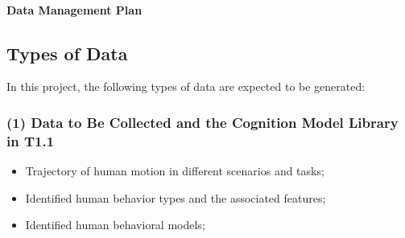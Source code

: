 \setcounter{page}{1}
\renewcommand{\thepage}{\arabic{page}}

~
\vspace{-15pt}
\begin{center}
\Large{\textbf{Data Management Plan}}
\end{center}

% 
% 
% 
% 
% 
% 

\subsection{Types of Data}
In this project, the following types of data are expected to be generated:

\subsubsection*{(1) Data to Be Collected and the Cognition Model Library in T1.1}
\begin{itemize} \itemsep0pt \parskip0pt 
\item Trajectory of human motion in different scenarios and tasks;
\item Identified human behavior types and the associated features;
\item Identified human behavioral models;
\end{itemize}
\vspace{-10pt}


